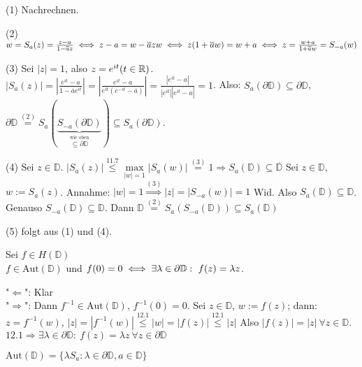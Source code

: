 \documentclass[a4paper,twoside,DIV15,BCOR12mm]{scrbook}
\def\gdw{\equizu}
\def\MdD{\mathbb{D}}
\def\gdw{\equizu}
\begin{document}
\begin{beweis}
\begin{liste}
\item[(1)] Nachrechnen.
\item[(2)] $w = S_a(z) = \frac{z-a}{1-\overline{a}z} \gdw z-a = w - \overline{a}zw \gdw z(1+\overline{a}w) = w+a \gdw z = \frac{w+a}{1+\overline{a}w} = S_{-a}(w)$
\item[(3)] Sei $|z| = 1$, also $z=e^{it} (t\in\mathbb{R})$.$|S_a(z)| = |\frac{e^{it} - a}{1-\overline{a}e^{it}}| = |\frac{e^{it} -a}{e^{it}(e^{-it}-\overline{a})}| = \frac{|e^{it} -a|}{|e^{it}||\overline{e^{it}-a}|} = 1$. Also: $S_a(\partial \MdD) \subseteq \partial \MdD$, $\partial \MdD \stackrel{(2)}{=} S_a( \underbrace{S_{-a}(\partial \MdD)}_{\stackrel{\text{wie oben}}{\subseteq \partial \MdD}} ) \subseteq S_a(\partial \MdD)$.
\item[(4)] Sei $z \in \MdD$. $|S_a(z)| \stackrel{\text{11.7}}{\leq} \max\limits_{|w|=1}|S_a(w)| \stackrel{(3)}{=} 1 \Rightarrow S_a(\MdD) \subseteq \overline{\MdD}$
Sei $z \in \MdD$, $w:=S_a(z)$. Annahme: $|w|=1 \stackrel{(3)}{\Rightarrow} |z| = |S_{-a}(w)| = 1$ Wid.
Also $S_a(\MdD) \subseteq \MdD$. Genauso $S_{-a}(\MdD) \subseteq \MdD$. Dann $\MdD \stackrel{(2)}{=} S_a(S_{-a}(\MdD)) \subseteq S_a(\MdD)$
\item[(5)] folgt aus (1) und (4).
\end{liste}
\end{beweis}

\begin {satz}
 Sei $f \in H(\MdD)$\\ $f \in \mbox{Aut}(\MdD)$ und $f(0)=0 \equizu \exists \lambda \in \partial \MdD:\ f(z) = \lambda z$.
\end{satz}
\begin{beweis}
  "$\Leftarrow$": Klar \\
  "$\Rightarrow$": Dann $f^{-1} \in \mbox{Aut}(\MdD)$, $f^{-1}(0) = 0$. Sei $z \in \MdD$, $w := f(z)$; dann: \\
   $z = f^{-1}(w)$, $|z| = |f^{-1}(w)| \stackrel{12.1}{\leq} |w| = |f(z)|\stackrel{12.1}{\leq} |z|$ Also 
   $|f(z)| = |z|\  \forall z \in \MdD$. $12.1 \Rightarrow \exists \lambda \in \partial \MdD:\ f(z) = \lambda z\ \forall z \in \partial \MdD$
\end{beweis}

\begin{satz}
 $\mbox{Aut}(\MdD) = \{ \lambda S_a: \lambda \in \partial \MdD, a \in \MdD\}$
\end{satz}
\end{document}
